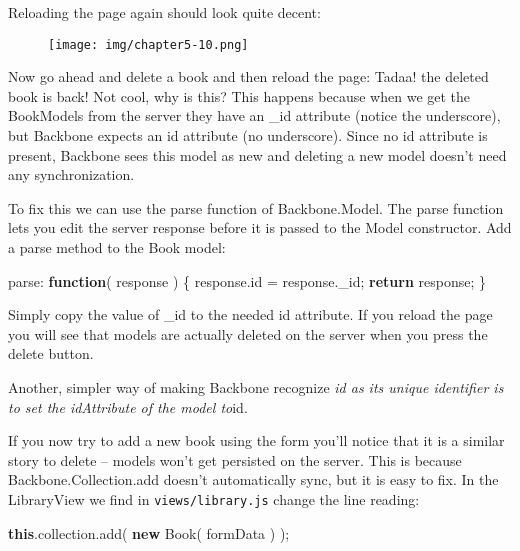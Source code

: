 \documentclass[9pt]{book}
\newenvironment{Shaded}{}{}
\newcommand{\KeywordTok}[1]{\textcolor[rgb]{0.00,0.44,0.13}{\textbf{{#1}}}}
\newcommand{\OtherTok}[1]{\textcolor[rgb]{0.00,0.44,0.13}{{#1}}}
\newcommand{\FunctionTok}[1]{\textcolor[rgb]{0.02,0.16,0.49}{{#1}}}
\newcommand{\NormalTok}[1]{{#1}}
\begin{document}
Reloading the page again should look quite decent:

\begin{figure}[htbp]
\centering
\texttt{[image: img/chapter5-10.png]}
\end{figure}

Now go ahead and delete a book and then reload the page: Tadaa! the
deleted book is back! Not cool, why is this? This happens because when
we get the BookModels from the server they have an \_id attribute
(notice the underscore), but Backbone expects an id attribute (no
underscore). Since no id attribute is present, Backbone sees this model
as new and deleting a new model doesn't need any synchronization.

To fix this we can use the parse function of Backbone.Model. The parse
function lets you edit the server response before it is passed to the
Model constructor. Add a parse method to the Book model:

\begin{Shaded}
\begin{Highlighting}[]
\NormalTok{parse: }\KeywordTok{function}\NormalTok{( response ) \{}
    \OtherTok{response}\NormalTok{.}\FunctionTok{id} \NormalTok{= }\OtherTok{response}\NormalTok{.}\FunctionTok{_id}\NormalTok{;}
    \KeywordTok{return} \NormalTok{response;}
\NormalTok{\}}
\end{Highlighting}
\end{Shaded}

Simply copy the value of \_id to the needed id attribute. If you reload
the page you will see that models are actually deleted on the server
when you press the delete button.

Another, simpler way of making Backbone recognize \emph{id as its unique
identifier is to set the idAttribute of the model to}id.

If you now try to add a new book using the form you'll notice that it is
a similar story to delete -- models won't get persisted on the server.
This is because Backbone.Collection.add doesn't automatically sync, but
it is easy to fix. In the LibraryView we find in
\texttt{views/library.js} change the line reading:

\begin{Shaded}
\begin{Highlighting}[]
\KeywordTok{this}\NormalTok{.}\OtherTok{collection}\NormalTok{.}\FunctionTok{add}\NormalTok{( }\KeywordTok{new} \FunctionTok{Book}\NormalTok{( formData ) );}
\end{Highlighting}
\end{Shaded}
\end{document}
